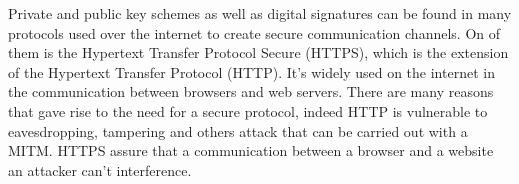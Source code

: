 Private and public key schemes as well as digital signatures can be found in many protocols used over the internet to create secure communication channels. On of them is the Hypertext Transfer Protocol Secure (HTTPS), which is the extension of the Hypertext Transfer Protocol (HTTP). It's widely used on the internet in the communication between browsers and web servers. There are many reasons that gave rise to the need for a secure protocol, indeed HTTP is vulnerable to eavesdropping, tampering and others attack that can be carried out with a MITM. HTTPS assure that a communication between a browser and a website an attacker can't interference.
